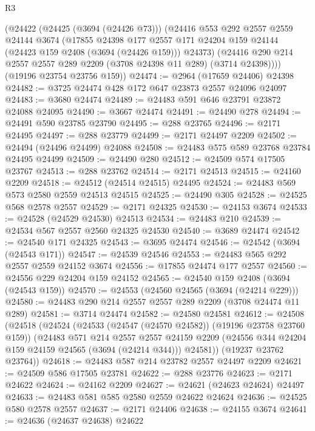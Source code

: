 \begin{lexlean}{R3}
\begin{coremodule}
      (@24422
        (@24425 (@3694 (@24426 @73)))
        (@24416
          @553
          @292
          @2557
          @2559
          @24144
          @3674
          (@17855
            @24398
            @177
            @2557
            @171
            @24204
            @159
            @24144
            (@24423 @159 @2408 (@3694 (@24426 @159)))
            @24373)
          (@24416 @290 @214 @2557 @2557 @289 @2209 (@3708 @24398 @11 @289) (@3714 @24398))))
      (@19196 @23754 @23756 @159))
@24474 := @2964 (@17659 @24406) @24398
@24482 := @3725 @24474 @428 @172 @647 @23873 @2557 @24096 @24097
@24483 := @3680 @24474
@24489 := @24483 @591 @646 @23791 @23872 @24088 @24095
@24490 := @3667 @24474
@24491 := @24490 @278
@24494 := @24491 @590 @23785 @23790
@24495 := @288 @23765
@24496 := @2171 @24495
@24497 := @288 @23779
@24499 := @2171 @24497 @2209
@24502 := @24494 (@24496 @24499) @24088
@24508 := @24483 @575 @589 @23768 @23784 @24495 @24499
@24509 := @24490 @280
@24512 := @24509 @574 @17505 @23767
@24513 := @288 @23762
@24514 := @2171 @24513
@24515 := @24160 @2209
@24518 := @24512 (@24514 @24515) @24495
@24524 := @24483 @569 @573 @2580 @2559 @24513 @24515
@24525 := @24490 @305
@24528 := @24525 @568 @2578 @2557
@24529 := @2171 @24325
@24530 := @24153 @3674
@24533 := @24528 (@24529 @24530) @24513
@24534 := @24483 @210
@24539 := @24534 @567 @2557 @2560 @24325 @24530
@24540 := @3689 @24474
@24542 := @24540 @171 @24325
@24543 := @3695 @24474
@24546 := @24542 (@3694 (@24543 @171))
@24547 := @24539 @24546
@24553 := @24483 @565 @292 @2557 @2559 @24152 @3674
@24556 := @17855 @24474 @177 @2557
@24560 := @24556 @229 @24204 @159 @24152
@24565 := @24540 @159 @2408 (@3694 (@24543 @159))
@24570 := @24553 (@24560 @24565 (@3694 (@24214 @229)))
@24580 := @24483 @290 @214 @2557 @2557 @289 @2209 (@3708 @24474 @11 @289)
@24581 := @3714 @24474
@24582 := @24580 @24581
@24612 := @24508
    (@24518
      (@24524
        (@24533 (@24547 (@24570 @24582)) (@19196 @23758 @23760 @159))
        (@24483
          @571
          @214
          @2557
          @2557
          @24159
          @2209
          (@24556 @344 @24204 @159 @24159 @24565 (@3694 (@24214 @344)))
          @24581))
      (@19237 @23762 @23764))
@24618 := @24483 @587 @214 @23782 @2557 @24497 @2209
@24621 := @24509 @586 @17505 @23781
@24622 := @288 @23776
@24623 := @2171 @24622
@24624 := @24162 @2209
@24627 := @24621 (@24623 @24624) @24497
@24633 := @24483 @581 @585 @2580 @2559 @24622 @24624
@24636 := @24525 @580 @2578 @2557
@24637 := @2171 @24406
@24638 := @24155 @3674
@24641 := @24636 (@24637 @24638) @24622

\end{coremodule}
\end{lexlean}
